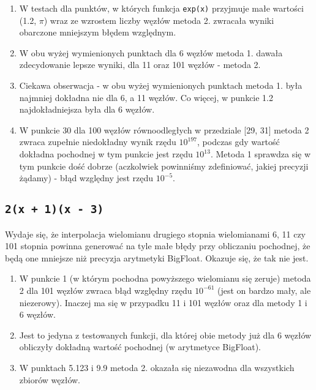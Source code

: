 \documentclass[a4paper,10pt]{article}
\begin{document}
     \begin{enumerate}
      \item W testach dla punktów, w których funkcja \texttt{exp(x)} przyjmuje małe wartości
      (1.2, $\pi$) wraz ze wzrostem liczby węzłów metoda 2. zwracała wyniki obarczone
      mniejszym błędem względnym.
      \item W obu wyżej wymienionych punktach dla 6 węzłów metoda 1. dawała zdecydowanie lepsze
      wyniki, dla 11 oraz 101 węzłów - metoda 2.
       \item Ciekawa obserwacja - w obu wyżej wymienionych punktach metoda 1. była
      najmniej dokładna nie dla 6, a 11 węzłów. Co więcej, w punkcie 1.2 najdokładniejsza była
      dla 6 węzłów.
      \item W punkcie 30 dla 100 węzłów równoodległych w przedziale [29, 31]
      metoda 2 zwraca zupełnie niedokładny wynik rzędu $10^{197}$, podczas gdy wartość dokładna
      pochodnej w tym punkcie jest rzędu $10^{13}$. Metoda 1 sprawdza się w tym punkcie dość dobrze
      (aczkolwiek powinniśmy zdefiniować, jakiej precyzji żądamy) - błąd względny jest rzędu 
      $10^{-5}$.
     \end{enumerate}
     
    \subsection{\texttt{2(x + 1)(x - 3)}}
     Wydaje się, że interpolacja wielomianu drugiego stopnia wielomianami 6, 11 czy 101 stopnia
     powinna generować na tyle małe błędy przy obliczaniu pochodnej, że będą one mniejsze niż precyzja
     arytmetyki BigFloat. Okazuje się, że tak nie jest.
     \begin{enumerate}
      \item W punkcie 1 (w którym pochodna powyższego wielomianu się zeruje) metoda 2 dla 101 węzłów
      zwraca błąd względny rzędu $10^{-61}$ (jest on bardzo mały, ale niezerowy). Inaczej ma się w przypadku
      11 i 101 węzłów oraz dla metody 1 i 6 węzłów.
      \item Jest to jedyna z testowanych funkcji, dla której obie metody już dla 6 węzłów
      obliczyły dokładną wartość pochodnej (w arytmetyce BigFloat).
      \item W punktach 5.123 i 9.9 metoda 2. okazała się niezawodna dla wszystkich zbiorów węzłów.
      
     \end{enumerate}
\end{document}

